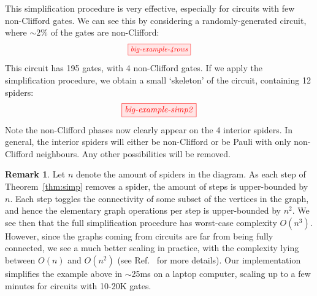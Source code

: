 \documentclass[a4paper,onecolumn,superscriptaddress,11pt,accepted=2020-04-27]{quantumarticle}
\theoremstyle{definition}
\newtheorem{remark}[theorem]{Remark}
\begin{document}

This simplification procedure is very effective, especially for circuits with few non-Clifford gates. We can see this by considering a randomly-generated circuit, where $\sim2\%$ of the gates are non-Clifford:
\[ \scalebox{0.85}{\tikzfig{big-example-4rows}} \]
This circuit has 195 gates, with 4 non-Clifford gates. If we apply the simplification procedure, we obtain a small `skeleton' of the circuit, containing 12 spiders:
\begin{equation}\label{eq:big-example-skeleton}
	\tikzfig{big-example-simp2}
\end{equation}
Note the non-Clifford phases now clearly appear on the 4 interior spiders. In general, the interior spiders will either be non-Clifford or be Pauli with only non-Clifford neighbours. Any other possibilities will be removed.

\begin{remark}\label{rem:simp-performance}
Let $n$ denote the amount of spiders in the diagram. As each step of Theorem~\ref{thm:simp} removes a spider, the amount of steps is upper-bounded by $n$. Each step toggles the connectivity of some subset of the vertices in the graph, and hence the elementary graph operations per step is upper-bounded by $n^2$. We see then that the full simplification procedure has worst-case complexity $O(n^3)$. However, since the graphs coming from circuits are far from being fully connected, we see a much better scaling in practice, with the complexity lying between $O(n)$ and $O(n^2)$ (see Ref.~\cite{pyzx} for more details). Our implementation simplifies the example above in $\sim$25ms on a laptop computer, scaling up to a few minutes for circuits with 10-20K gates.
\end{remark}
\end{document}

